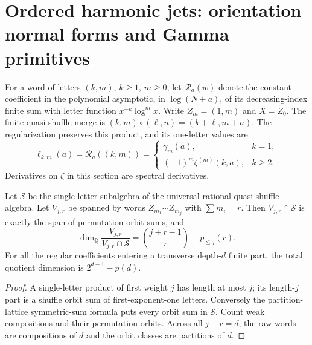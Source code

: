 \section{Ordered harmonic jets: orientation normal forms and Gamma primitives}
\label{ojnf:sec:normal-forms}

For a word of letters $(k,m)$, $k\ge1$, $m\ge0$, let
$\mathcal R_a(w)$ denote the constant coefficient in the polynomial
asymptotic, in $\log(N+a)$, of its decreasing-index finite sum with
letter function $x^{-k}\log^m x$. Write $Z_m=(1,m)$ and $X=Z_0$.
The finite quasi-shuffle merge is $(k,m)\circ(\ell,n)=(k+\ell,m+n)$.
The regularization preserves this product, and its one-letter values are
\[
 \ell_{k,m}(a)=\mathcal R_a((k,m))=
 \begin{cases}\gamma_m(a),&k=1,\\(-1)^m\zeta^{(m)}(k,a),&k\ge2.\end{cases}
\]
Derivatives on $\zeta$ in this section are spectral derivatives.

\begin{theorem}\label{ojnf:thm:rank}
Let $\mathcal S$ be the single-letter subalgebra of the universal rational
quasi-shuffle algebra. Let $V_{j,r}$ be spanned by words
$Z_{m_1}\cdots Z_{m_j}$ with $\sum m_i=r$.
Then $V_{j,r}\cap\mathcal S$ is exactly the span of permutation-orbit sums,
and
\[
 \dim_{\mathbb Q}\frac{V_{j,r}}{V_{j,r}\cap\mathcal S}
 =\binom{j+r-1}{r}-p_{\le j}(r).
\]
For all the regular coefficients entering a transverse depth-$d$ finite
part, the total quotient dimension is $2^{d-1}-p(d)$.
\end{theorem}
\begin{proof}
A single-letter product of first weight $j$ has length at most $j$;
its length-$j$ part is a shuffle orbit sum of first-exponent-one letters.
Conversely the partition-lattice symmetric-sum formula puts every orbit
sum in $\mathcal S$. Count weak compositions and their permutation
orbits. Across all $j+r=d$, the raw words are compositions of $d$ and
the orbit classes are partitions of $d$.
\end{proof}

